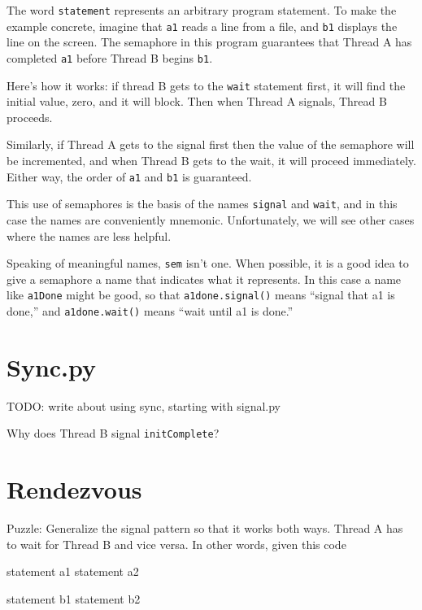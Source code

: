 \documentclass{book}
\begin{document}
The word {\tt statement} represents an arbitrary program statement.
To make the example concrete, imagine that {\tt a1} reads a line
from a file, and {\tt b1} displays the line on the screen.
The semaphore in this program guarantees that Thread A
has completed {\tt a1} before Thread B begins {\tt b1}.

Here's how it works: if thread B gets to the
    {\tt wait} statement first, it will find the initial
value, zero, and it will block.  Then when Thread A signals,
Thread B proceeds.

Similarly, if Thread A gets to the signal first then the
value of the semaphore will be incremented, and when Thread
B gets to the wait, it will proceed immediately.
Either way, the order of {\tt a1} and {\tt b1} is guaranteed.

This use of semaphores is the basis of the names {\tt signal}
and {\tt wait}, and in this case the names are conveniently
mnemonic.  Unfortunately, we will see other cases where the
names are less helpful.

Speaking of meaningful names, {\tt sem} isn't one.  When
possible, it is a good idea to give a semaphore a name
that indicates what it represents.  In this case a name like
    {\tt a1Done} might be good, so that {\tt a1done.signal()} means
``signal that a1 is done,'' and {\tt a1done.wait()} means
``wait until a1 is done.''


\section{Sync.py}
\label{sync.py}

TODO: write about using sync, starting with signal.py

Why does Thread B signal {\tt initComplete}?



\section{Rendezvous}
\label{rendezvous}

Puzzle: Generalize the signal pattern so that it works both
ways.  Thread A has to wait for Thread B and vice versa.  In other
words, given this code

\begin{minipage}[t]{0.35\textwidth}
    \begin{unbreakable}[title={Thread A}]{}
statement a1
statement a2
\end{unbreakable}
\end{minipage}
\hfill
\begin{minipage}[t]{0.35\textwidth}
    \begin{unbreakable}[title={Thread B}]{}
statement b1
statement b2
\end{unbreakable}
\end{minipage}
\end{document}

